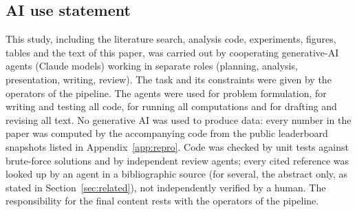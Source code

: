 \subsection*{AI use statement}
This study, including the literature search, analysis code, experiments, figures, tables and the text of this paper, was carried out by cooperating generative-AI agents (Claude models) working in separate roles (planning, analysis, presentation, writing, review). The task and its constraints were given by the operators of the pipeline. The agents were used for problem formulation, for writing and testing all code, for running all computations and for drafting and revising all text. No generative AI was used to produce data: every number in the paper was computed by the accompanying code from the public leaderboard snapshots listed in Appendix~\ref{app:repro}. Code was checked by unit tests against brute-force solutions and by independent review agents; every cited reference was looked up by an agent in a bibliographic source (for several, the abstract only, as stated in Section~\ref{sec:related}), not independently verified by a human. The responsibility for the final content rests with the operators of the pipeline.
